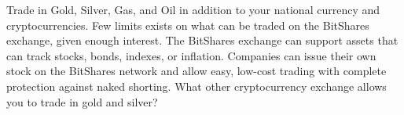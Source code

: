 Trade in Gold, Silver, Gas, and Oil in addition to your national currency and
cryptocurrencies. Few limits exists on what can be traded on the BitShares
exchange, given enough interest. The BitShares exchange can support assets
that can track stocks, bonds, indexes, or inflation. Companies can issue their
own stock on the BitShares network and allow easy, low-cost trading with
complete protection against naked shorting. What other cryptocurrency exchange
allows you to trade in gold and silver? 
